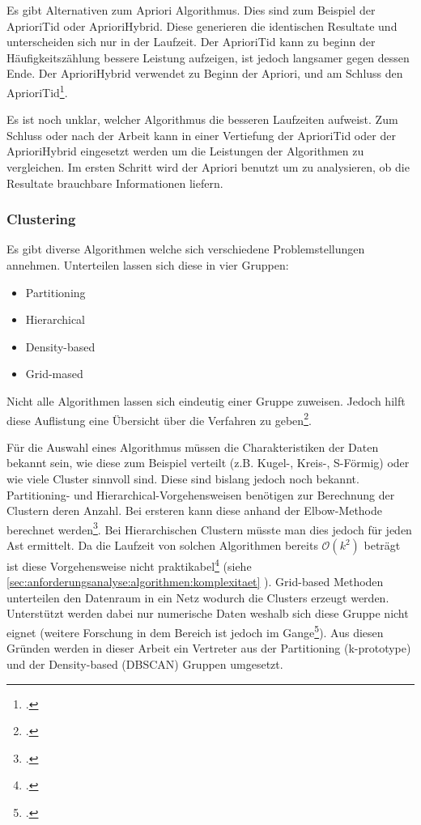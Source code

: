 Es gibt Alternativen zum Apriori Algorithmus. Dies sind zum Beispiel der AprioriTid oder AprioriHybrid. Diese generieren die identischen Resultate und unterscheiden sich nur in der Laufzeit. Der AprioriTid kann zu beginn der Häufigkeitszählung bessere Leistung aufzeigen, ist jedoch langsamer gegen dessen Ende. Der AprioriHybrid verwendet zu Beginn der Apriori, und am Schluss den AprioriTid\footcite{association_rule_learning_2017-01-05}. 

Es ist noch unklar, welcher Algorithmus die besseren Laufzeiten aufweist. Zum Schluss oder nach der Arbeit kann in einer Vertiefung der AprioriTid oder der AprioriHybrid eingesetzt werden um die Leistungen der Algorithmen zu vergleichen. Im ersten Schritt wird der Apriori benutzt um zu analysieren, ob die Resultate brauchbare Informationen liefern.

\subsubsection{Clustering}
\label{sec:konzept:algorithmenauswahl:clustering}
Es gibt diverse Algorithmen welche sich verschiedene Problemstellungen annehmen. Unterteilen lassen sich diese in vier Gruppen:
\begin{itemize}
	\item Partitioning
	\item Hierarchical
	\item Density-based
	\item Grid-mased
\end{itemize}
Nicht alle Algorithmen lassen sich eindeutig einer Gruppe zuweisen. Jedoch hilft diese Auflistung eine Übersicht über die Verfahren zu geben\footcite{data_mining_concepts_and_techniques}.

Für die Auswahl eines Algorithmus müssen die Charakteristiken der Daten bekannt sein, wie diese zum Beispiel verteilt (z.B. Kugel-, Kreis-, S-Förmig) oder wie viele Cluster sinnvoll sind. Diese sind bislang jedoch noch bekannt.
Partitioning- und Hierarchical-Vorgehensweisen benötigen zur Berechnung der Clustern deren Anzahl. Bei ersteren kann diese anhand der Elbow-Methode berechnet werden\footcite{elbow_method}. Bei Hierarchischen Clustern müsste man dies jedoch für jeden Ast ermittelt. Da die Laufzeit von solchen Algorithmen bereits $\mathcal{O}(k^2)$ beträgt ist diese Vorgehensweise nicht praktikabel\footcite{complexity_hierarchical_clustering} (siehe \cref{sec:anforderungsanalyse:algorithmen:komplexitaet} ). Grid-based Methoden unterteilen den Datenraum in ein Netz wodurch die Clusters erzeugt werden. Unterstützt werden dabei nur numerische Daten weshalb sich diese Gruppe nicht eignet (weitere Forschung in dem Bereich ist jedoch im Gange\footcite{sting_categorical_data}).
Aus diesen Gründen werden in dieser Arbeit ein Vertreter aus der Partitioning (k-prototype) und der Density-based (DBSCAN) Gruppen umgesetzt.

